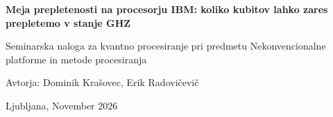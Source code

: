 \makeatletter


\renewcommand\thesection{\@arabic\c@section}
\renewcommand\thesubsection{\thesection.\@arabic\c@subsection}
\renewcommand\theequation{\@arabic\c@equation}
\renewcommand\thefigure{\@arabic\c@figure}
\renewcommand\thetable{\@arabic\c@table}

\def\title#1{}
\def\titlerunning#1{}
\def\author#1{}
\def\maketitle{}

\let\cleardoublepage\clearpage
\let\clearemptydoublepage\clearpage
\let\startnewpage\clearpage
\let\ps@bchap\ps@plain
\renewcommand\backmatter{\clearpage}

\makeatother

\thispagestyle{empty}
\begin{center}
\vspace*{2.5cm}
{\LARGE\bfseries Meja prepletenosti na procesorju IBM: koliko kubitov lahko zares prepletemo v stanje GHZ\par}
\vspace{1.2cm}
{\large Seminarska naloga za kvantno procesiranje pri predmetu Nekonvencionalne platforme in metode procesiranja\par}
\end{center}
\vspace{5cm}
\begin{flushright}
Avtorja: Dominik Krašovec, Erik Radovičevič
\end{flushright}
\vfill
\begin{center}
Ljubljana, November 2026
\end{center}
\clearpage

\tableofcontents
\thispagestyle{empty}
\clearpage

\pagestyle{plain}
